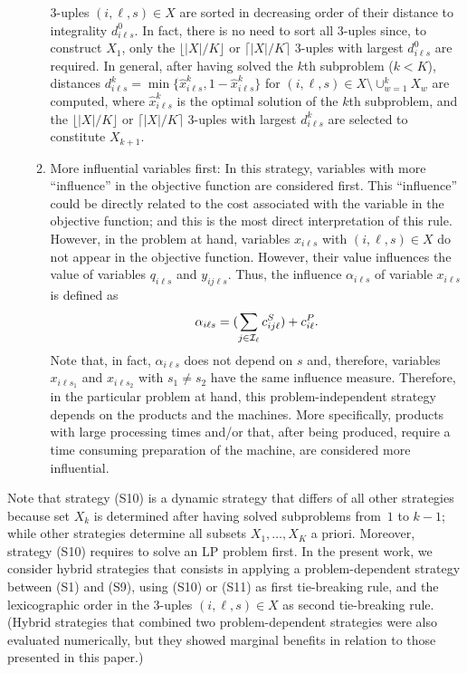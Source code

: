 \documentclass[11pt]{article}
\begin{document}
\begin{itemize}
\begin{enumerate}[label=(S{{\arabic*}})]
\[    \]
    3-uples $(i, \ell, s) \in X$ are sorted in decreasing order of their distance to integrality $d_{i \ell s}^0$. In fact, there is no need to sort all 3-uples since, to construct $X_1$, only the $\lfloor |X|/K \rfloor$ or $\lceil |X|/K \rceil$ 3-uples with largest $d_{i \ell s}^0$ are required. In general, after having solved the $k$th subproblem ($k<K$), distances $d_{i \ell s}^k= \min\{ \hat x_{i \ell s}^k, 1 - \hat x_{i \ell s}^k\}$ for $(i,\ell,s) \in X \setminus \cup_{w=1}^k X_w$ are computed, where $\hat x_{i \ell s}^k$ is the optimal solution of the $k$th subproblem, and the $\lfloor |X|/K \rfloor$ or $\lceil |X|/K \rceil$ 3-uples with largest $d_{i \ell s}^k$  are selected to constitute $X_{k+1}$.
    \item More influential variables first: In this strategy, variables with more ``influence'' in the objective function are considered first. This ``influence'' could be directly related to the cost associated with the variable in the objective function; and this is the most direct interpretation of this rule. However, in the problem at hand, variables $x_{i \ell s}$ with $(i,\ell,s) \in X$ do not appear in the objective function. However, their value influences the value of variables $q_{i \ell s}$ and $y_{ij\ell s}$. Thus, the influence $\alpha_{i \ell s}$ of variable $x_{i \ell s}$ is defined as
    \[
    \alpha_{i \ell s} = ( \sum_{j \in {\cal I}_{\ell}} c_{ij\ell}^S  ) + c_{i \ell}^P.
    \]
    Note that, in fact, $\alpha_{i \ell s}$ does not depend on $s$ and, therefore, variables $x_{i \ell s_1}$ and $x_{i \ell s_2}$ with $s_1 \neq s_2$ have the same influence measure. Therefore, in the particular problem at hand, this problem-independent strategy depends on the products and the machines. More specifically, products with large processing times and/or that, after being produced, require a time consuming preparation of the machine, are considered more influential.
    \end{enumerate}
\end{itemize}

Note that strategy (S10) is a dynamic strategy that differs of all other strategies because set $X_k$ is determined after having solved subproblems from~$1$ to $k-1$; while other strategies determine all subsets $X_1, \dots, X_K$ a priori. Moreover, strategy (S10) requires to solve an LP problem first. In the present work, we consider hybrid strategies that consists in applying a problem-dependent strategy between (S1) and (S9), using (S10) or (S11) as first tie-breaking rule, and the lexicographic order in the 3-uples $(i, \ell, s) \in X$ as second tie-breaking rule. (Hybrid strategies that combined two problem-dependent strategies were also evaluated numerically, but they showed marginal benefits in relation to those presented in this paper.)
\end{document}
